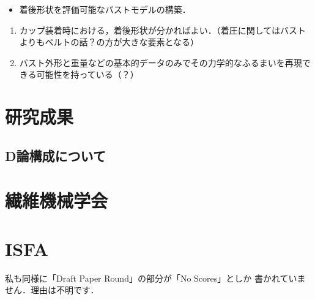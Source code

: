 \documentclass[11pt]{jsarticle}
\begin{document}
	\articleSPRabst
		\begin{itemize}
			\item 着後形状を評価可能なバストモデルの構築．
		\end{itemize}
		
		
	\articleSPRobj
		\begin{enumerate}
			\item カップ装着時における，着後形状が分かればよい．（着圧に関してはバストよりもベルトの話？の方が大きな要素となる）
			\item バスト外形と重量などの基本的データのみでその力学的なふるまいを再現できる可能性を持っている（？）
		\end{enumerate}
	\articleSPRitemsone
		
		\tableofcontents
		
		
	\articleSPRitemstwo
	\section{研究成果}
			\subsection{D論構成について}
	\section{繊維機械学会}
	\section{ISFA}
	私も同様に「Draft Paper Round」の部分が「No Scores」としか 
	書かれていません．理由は不明です．
		
	
	
	\newpage
\vspace{10cm}

\vspace{14cm}
	\articleSPRfour
	\articleSPRfive
\end{document}
